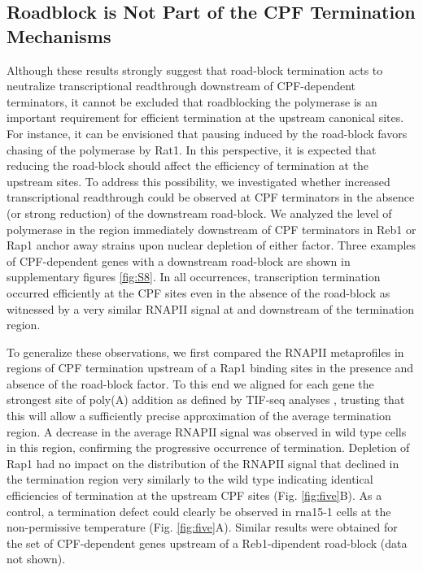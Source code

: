\singlespacing
\subsection*{Roadblock is Not Part of the CPF Termination Mechanisms}
\doublespacing


Although these results strongly suggest that road-block termination acts to neutralize transcriptional readthrough downstream of CPF-dependent terminators, it cannot be excluded that roadblocking the polymerase is an important requirement for efficient termination at the upstream canonical sites. For instance, it can be envisioned that pausing induced by the road-block favors chasing of the polymerase by Rat1. In this perspective, it is expected that reducing the road-block should affect the efficiency of termination at the upstream sites. To address this possibility, we investigated whether increased transcriptional readthrough could be observed at CPF terminators in the absence (or strong reduction) of the downstream road-block. We analyzed the level of polymerase in the region immediately downstream of CPF terminators in Reb1 or Rap1 anchor away strains upon nuclear depletion of either factor. Three examples of CPF-dependent genes with a downstream road-block are shown in supplementary figures \ref{fig:S8}. In all occurrences, transcription termination occurred efficiently at the CPF sites even in the absence of the road-block as witnessed by a very similar RNAPII signal at and downstream of the termination region. 

To generalize these observations, we first compared the RNAPII metaprofiles in regions of CPF termination upstream of a Rap1 binding sites in the presence and absence of the road-block factor. To this end we aligned for each gene the strongest site of poly(A) addition as defined by TIF-seq analyses \cite{pelechano:2013:extensive}, trusting that this will allow a sufficiently precise approximation of the average termination region. A decrease in the average RNAPII signal was observed in wild type cells in this region, confirming the progressive occurrence of termination. Depletion of Rap1 had no impact on the distribution of the RNAPII signal that declined in the termination region very similarly to the wild type indicating identical efficiencies of termination at the upstream CPF sites (Fig. \ref{fig:five}B). As a control, a termination defect could clearly be observed in rna15-1 cells at the non-permissive temperature (Fig. \ref{fig:five}A). Similar results were obtained for the set of CPF-dependent genes upstream of a Reb1-dipendent road-block (data not shown). 

